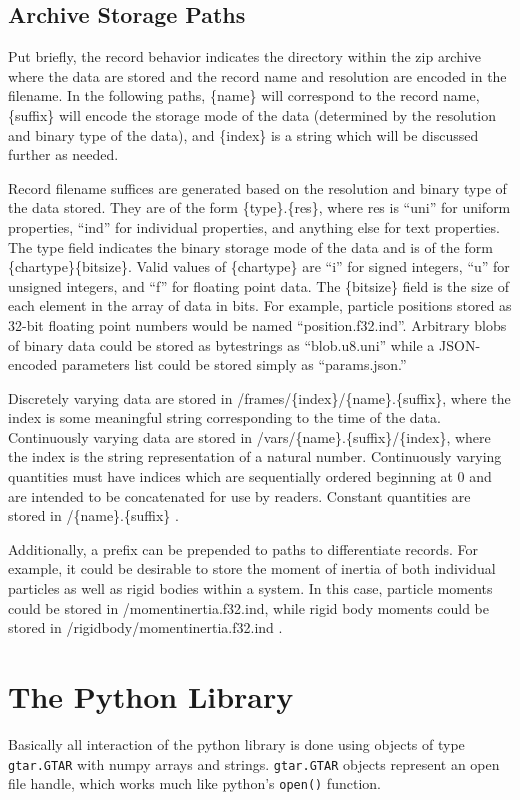 \documentclass{article}
\begin{document}
\subsection{Archive Storage Paths}
Put briefly, the record behavior indicates the directory within the zip archive where the data are stored and the record name and resolution are encoded in the filename.
In the following paths, \{name\} will correspond to the record name, \{suffix\} will encode the storage mode of the data (determined by the resolution and binary type of the data), and \{index\} is a string which will be discussed further as needed.

Record filename suffices are generated based on the resolution and binary type of the data stored.
They are of the form \{type\}.\{res\}, where res is ``uni'' for uniform properties, ``ind'' for individual properties, and anything else for text properties.
The type field indicates the binary storage mode of the data and is of the form \{chartype\}\{bitsize\}.
Valid values of \{chartype\} are ``i'' for signed integers, ``u'' for unsigned integers, and ``f'' for floating point data.
The \{bitsize\} field is the size of each element in the array of data in bits.
For example, particle positions stored as 32-bit floating point numbers would be named ``position.f32.ind''.
Arbitrary blobs of binary data could be stored as bytestrings as ``blob.u8.uni'' while a JSON-encoded parameters list could be stored simply as ``params.json.''

Discretely varying data are stored in /frames/\{index\}/\{name\}.\{suffix\}, where the index is some meaningful string corresponding to the time of the data.
Continuously varying data are stored in /vars/\{name\}.\{suffix\}/\{index\}, where the index is the string representation of a natural number.
Continuously varying quantities must have indices which are sequentially ordered beginning at 0 and are intended to be concatenated for use by readers.
Constant quantities are stored in /\{name\}.\{suffix\} .

Additionally, a prefix can be prepended to paths to differentiate records.
For example, it could be desirable to store the moment of inertia of both individual particles as well as rigid bodies within a system.
In this case, particle moments could be stored in /moment\textunderscore inertia.f32.ind, while rigid body moments could be stored in /rigid\textunderscore body/moment\textunderscore inertia.f32.ind .

\section{The Python Library}
Basically all interaction of the python library is done using objects of type \texttt{gtar.GTAR} with numpy arrays and strings.
\texttt{gtar.GTAR} objects represent an open file handle, which works much like python's \texttt{open()} function.
\end{document}
